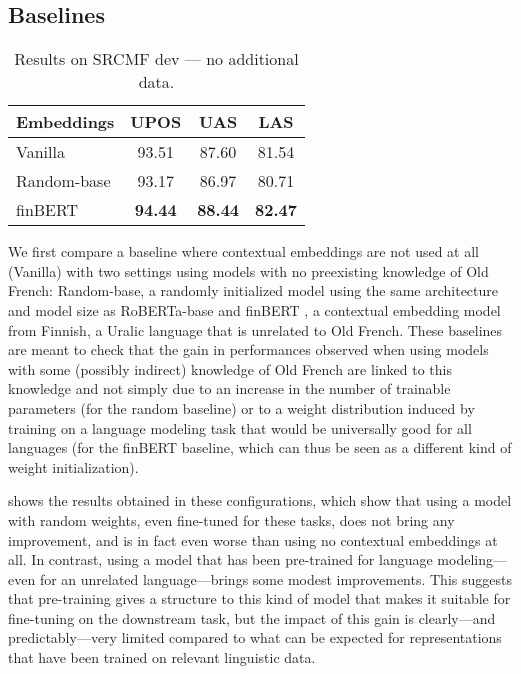 \subsection{Baselines}\label{sec|baselines}
\begin{table}[thb]
    \centering
    \tablefontsize
    \begin{tabular}{l*{3}{S[table-format=2.2]}}
        \toprule
        {\textbf{Embeddings}} & {\textbf{UPOS}} & {\textbf{UAS}} & {\textbf{LAS}} \\
        \midrule
        Vanilla               & 93.51           & 87.60          & 81.54          \\
        Random-base           & 93.17           & 86.97          & 80.71          \\
        finBERT               & \textbf{94.44}  & \textbf{88.44} & \textbf{82.47} \\
        \bottomrule
    \end{tabular}
    \caption{Results on SRCMF dev — no additional data.}\label{tab|nodata}
\end{table}

We first compare a baseline where contextual embeddings are not used at all (Vanilla) with two settings using models with no preexisting knowledge of Old French: Random-base, a randomly initialized model using the same architecture and model size as RoBERTa-base \citep{liu-etal-2019-roberta} and finBERT \citep{virtanen-etal-2019-multilingual}, a contextual embedding model from Finnish, a Uralic language that is unrelated to Old French. These baselines are meant to check that the gain in performances observed when using models with some (possibly indirect) knowledge of Old French are linked to this knowledge and not simply due to an increase in the number of trainable parameters (for the random baseline) or to a weight distribution induced by training on a language modeling task that would be universally good for all languages (for the finBERT baseline, which can thus be seen as a different kind of weight initialization).

 shows the results obtained in these configurations, which show that using a model with random weights, even fine-tuned for these tasks, does not bring any improvement, and is in fact even worse than using no contextual embeddings at all. In contrast, using a model that has been pre-trained for language modeling---even for an unrelated language---brings some modest improvements. This suggests that pre-training gives a structure to this kind of model that makes it suitable for fine-tuning on the downstream task, but the impact of this gain is clearly---and predictably---very limited compared to what can be expected for representations that have been trained on relevant linguistic data.

